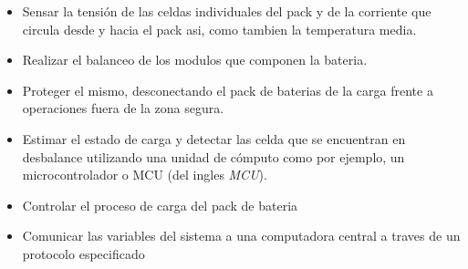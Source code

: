 \documentclass[10pt,a4paper]{article}
\begin{document}
\begin{itemize}
    \item Sensar la tensión de las celdas individuales del pack y de la 
	corriente que circula desde y hacia el pack asi, como tambien 
	la temperatura media.
    \item Realizar el balanceo de los modulos que componen la bateria.
    \item Proteger el mismo, desconectando el pack de baterias de la carga
	frente a operaciones fuera de la zona segura.
    \item Estimar el estado de carga y detectar las celda que se encuentran
	en desbalance utilizando una unidad de cómputo como por ejemplo, un
	microcontrolador o \acrshort{MCU} (del ingles \emph{\acrlong{MCU}}).
    \item Controlar el proceso de carga del pack de bateria
    \item Comunicar las variables del sistema a una computadora central a
	traves de un protocolo especificado
\end{itemize}
\end{document}
